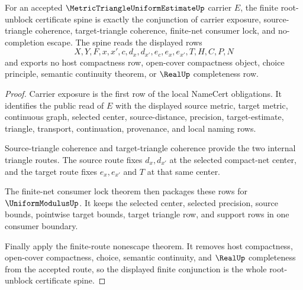 \begin{theorem}
\label{thm:metric-triangle-uniform-estimate-root-unblock-certificate-spine}
For an accepted $\MetricTriangleUniformEstimateUp$ carrier $E$, the finite root-unblock certificate spine is exactly the conjunction of carrier exposure, source-triangle coherence, target-triangle coherence, finite-net consumer lock, and no-completion escape. The spine reads the displayed rows
$$
X,Y,F,x,x',c,d_x,d_{x'},e_c,e_x,e_{x'},T,H,C,P,N
$$
and exports no host compactness row, open-cover compactness object, choice principle, semantic continuity theorem, or $\RealUp$ completeness row.
\end{theorem}
\begin{proof}
Carrier exposure is the first row of the local NameCert obligations. It identifies the public read of $E$ with the displayed source metric, target metric, continuous graph, selected center, source-distance, precision, target-estimate, triangle, transport, continuation, provenance, and local naming rows.

Source-triangle coherence and target-triangle coherence provide the two internal triangle routes. The source route fixes $d_x,d_{x'}$ at the selected compact-net center, and the target route fixes $e_x,e_{x'}$ and $T$ at that same center.

The finite-net consumer lock theorem then packages these rows for $\UniformModulusUp$. It keeps the selected center, selected precision, source bounds, pointwise target bounds, target triangle row, and support rows in one consumer boundary.

Finally apply the finite-route nonescape theorem. It removes host compactness, open-cover compactness, choice, semantic continuity, and $\RealUp$ completeness from the accepted route, so the displayed finite conjunction is the whole root-unblock certificate spine.
\end{proof}

